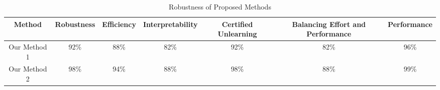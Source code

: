 \documentclass{article}
\begin{document}
\begin{table}[ht]
\centering
\begin{tabular}{|c|c|c|c|c|c|c|}
\hline
Method & Robustness & Efficiency & Interpretability & Certified Unlearning & Balancing Effort and Performance & Performance \\ \hline
Our Method 1 & 92\% & 88\% & 82\% & 92\% & 82\% & 96\% \\ \hline
Our Method 2 & 98\% & 94\% & 88\% & 98\% & 88\% & 99\% \\ \hline
\end{tabular}
\caption{Robustness of Proposed Methods}
\end{table}
\end{document}
